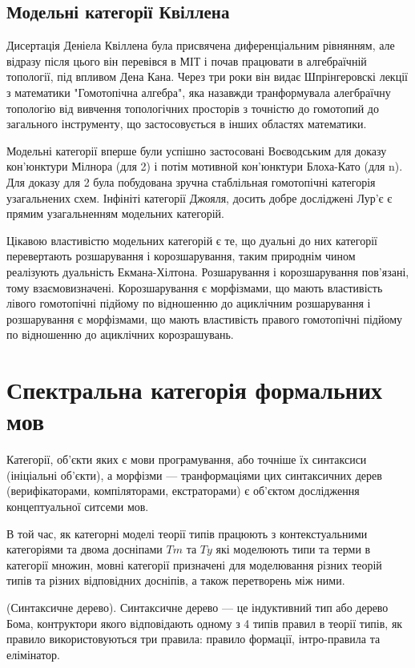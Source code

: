 \newpage
\subsection{Модельні категорії Квіллена}
Дисертація Деніела Квіллена була присвячена диференціальним рівнянням, але відразу після цього він
перевівся в МІТ і почав працювати в алгебраїчній топології, під впливом Дена Кана.
Через три роки він видає Шпрінгеровскі лекції з математики "Гомотопічна алгебра", яка
назавжди транформувала алегбраїчну топологію від вивчення топологічних просторів з точністю до гомотопий
до загального інструменту, що застосовується в інших областях математики.

Модельні категорії вперше були успішно застосовані Воєводським для доказу
кон'юнктури Мілнора (для 2) і потім мотивной кон'юнктури Блоха-Като (для n).
Для доказу для 2 була побудована зручна стаблільная гомотопічні категорія
узагальнених схем. Інфініті категорії Джояля, досить добре досліджені Лур'є
є прямим узагальненням модельних категорій.

Цікавою властивістю модельних категорій є те, що дуальні до них категорії
перевертають розшарування і корозшарування, таким природнім чином реалізують
дуальність Екмана-Хілтона. Розшарування і корозшарування пов'язані, тому взаємовизначені.
Корозшарування є морфізмами, що мають властивість лівого гомотопічні
підйому по відношенню до ациклічним розшарування і розшарування є морфізмами,
що мають властивість правого гомотопічні підйому по відношенню до ациклічних корозрашувань.

\newpage
\section{Спектральна категорія формальних мов}
Категорії, об'єкти яких є мови програмування, або точніше їх синтаксиси (ініціальні об'єкти), а
морфізми --- транформаціями цих синтаксичних дерев (верифікаторами, компіляторами, екстраторами)
є об'єктом дослідження концептуальної ситсеми мов.

В той час, як категорні моделі теорії типів працюють з контекстуальними категоріями
та двома досніпами $Tm$ та $Ty$ які моделюють типи та терми в категорії множин,
мовні категорії призначені для моделювання різних теорій типів та різних
відповідних досніпів, а також перетворень між ними.

\begin{definition} (Синтаксичне дерево).
Синтаксичне дерево --- це індуктивний тип або дерево Бома,
контруктори якого відповідають одному з 4 типів правил в теорії типів,
як правило використовуються три правила: правило формації, інтро-правила та елімінатор.
\end{definition}

